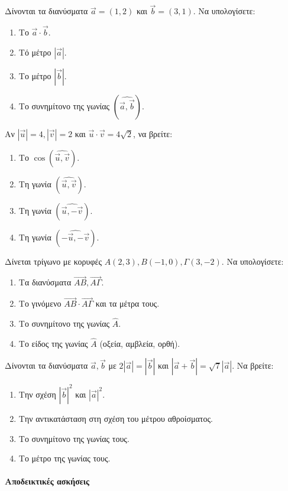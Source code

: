 \documentclass[11pt,a4paper,modern]{FFExercises}
\begin{document}
\askhsh
Δίνονται τα διανύσματα $\vec{a}=(1, 2)$ και $\vec{b}=(3, 1)$. Να υπολογίσετε:
\begin{enumerate}
    \item Το $\vec{a}\cdot\vec{b}$.
    \item Τό μέτρο $|\vec{a}|$.
    \item Το μέτρο $|\vec{b}|$.
    \item Το συνημίτονο της γωνίας $(\widehat{\vec{a},\vec{b}})$.
\end{enumerate}

\askhsh
Αν $|\vec{u}|=4, |\vec{v}|=2$ και $\vec{u}\cdot\vec{v}=4\sqrt{2}$, να βρείτε:
\begin{enumerate}
    \item Το $\cos(\widehat{\vec{u},\vec{v}})$.
    \item Τη γωνία $(\widehat{\vec{u},\vec{v}})$.
    \item Τη γωνία $(\widehat{\vec{u}, -\vec{v}})$.
    \item Τη γωνία $(\widehat{-\vec{u}, -\vec{v}})$.
\end{enumerate}

\askhsh
Δίνεται τρίγωνο με κορυφές $A(2,3), B(-1, 0), \Gamma(3, -2)$. Να υπολογίσετε:
\begin{enumerate}
    \item Τα διανύσματα $\vec{AB}, \vec{A\Gamma}$.
    \item Το γινόμενο $\vec{AB}\cdot\vec{A\Gamma}$ και τα μέτρα τους.
    \item Το συνημίτονο της γωνίας $\hat{A}$.
    \item Το είδος της γωνίας $\hat{A}$ (οξεία, αμβλεία, ορθή).
\end{enumerate}

\askhsh
Δίνονται τα διανύσματα $\vec{a}, \vec{b}$ με $2|\vec{a}|=|\vec{b}|$ και $|\vec{a}+\vec{b}| = \sqrt{7}|\vec{a}|$. Να βρείτε:
\begin{enumerate}
    \item Την σχέση $|\vec{b}|^2$ και $|\vec{a}|^2$.
    \item Την αντικατάσταση στη σχέση του μέτρου αθροίσματος.
    \item Το συνημίτονο της γωνίας τους.
    \item Το μέτρο της γωνίας τους.
\end{enumerate}

\paragraph{Αποδεικτικές ασκήσεις}
\end{document}
